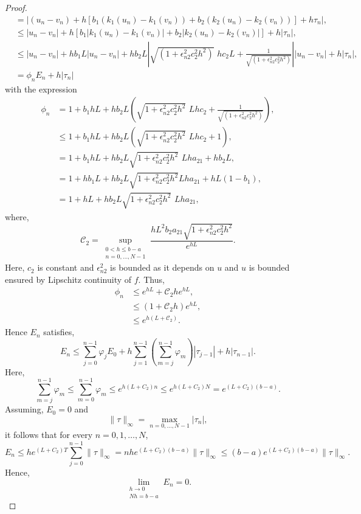 \documentclass[a4paper, preprint,11pt]{elsarticle}
\numberwithin{equation}{section}
\begin{document}
\begin{proof}
\begin{align*}
& = |(u_n - v_n) + h [ b_1(k_1(u_n) - k_1(v_n)) + b_2(k_2(u_n) - k_2(v_n))] + h\tau_n|, \\
& \leq |u_n -v_n| + h [b_1|k_1(u_n) - k_1(v_n)| + b_2|k_2(u_n)- k_2(v_n)|] + h|\tau_n|, \\
& \leq|u_n -v_n| + hb_1 L|u_n -v_n| + h b_2 L\left| \sqrt{(1 + \epsilon_{n2}^2 c_{2}^2 h^2)}\,\,  h c_2 L + \frac{1}{\sqrt{(1 + \epsilon_{n2}^2 c_{2}^2 h^2)}}\right||u_n -v_n|  + h|\tau_n|, \\
& = \phi_n E_n + h|\tau_n|
\end{align*}
with the expression
\begin{align*}
    \phi_n & = 1 + b_1hL + hb_2 L \left( \sqrt{1 + \epsilon_{n2}^2 c_{2}^2 h^2} \,\, L h c_2  + \frac{1}{\sqrt{(1 + \epsilon_{n2}^2 c_{2}^2 h^2)}} \right), \\
   & \leq 1 + b_1 h L + h b_2 L \left(\sqrt{1 + \epsilon_{n2}^2 c_{2}^2h^2}\,\, L h c_2 + 1\right), \\
   & = 1 + b_1 h L + h b_2 L \sqrt{1 + \epsilon_{n2}^2 c_{2}^2h^2}\,\,L ha_{21} + hb_2L, \\
   & = 1 + hb_1L + hb_2L\sqrt{1 + \epsilon_{n2}^2 c_{2}^2h^2}L ha_{21} + hL(1 - b_1), \\
   & = 1 + hL + hb_2L\sqrt{1 + \epsilon_{n2}^2 c_{2}^2h^2} \,\,Lh a_{21} ,
\end{align*}
where,
\[
\mathcal{C}_2 = \sup_{\substack{0 < h \leq b - a \\ n = 0, \dots, N - 1}} 
\frac{h L^2 b_2 a_{21} \sqrt{1 + \epsilon_{n2}^2 c_2^2 h^2}}{e^{hL}}. 
\]
Here, $c_2$ is constant and $\epsilon_{n2}^2$ is bounded as it depends on $u$ and $u$ is bounded ensured by Lipschitz continuity of $f$. Thus,
\begin{align*}
    \phi_n & \leq e^{hL} + \mathcal{C}_2 h e^{hL}, \\
      & \leq (1 + \mathcal{C}_2 h) e^{hL}, \\
      & \leq e^{h(L+\mathcal{C}_2)}.
\end{align*}
Hence $E_n$ satisfies, 
\begin{equation*}
    E_n \leq \sum_{j=0}^{n-1} \varphi_j E_0 + h \sum_{j=1}^{n-1} \left( \sum_{m=j}^{n-1} \varphi_m \right) |\tau_{j-1}| + h |\tau_{n-1}|.
\end{equation*}
Here,
\begin{equation*}
    \sum_{m=j}^{n-1} \varphi_m \leq \sum_{m=0}^{n-1} \varphi_m \leq e^{h(L + C_2) n} \leq e^{h(L + C_2) N} = e^{(L + C_2)(b - a)}.
\end{equation*}
Assuming, \( E_0 = 0 \) and
\[
\|\tau\|_\infty = \max_{n = 0, \dots, N-1} |\tau_n|,
\]
it follows that for every \( n = 0, 1, \dots, N \),
\begin{equation*}
    E_n \leq h e^{(L + C_2) T} \sum_{j=0}^{n-1} \|\tau\|_\infty = n h e^{(L + C_2)(b - a)} \|\tau\|_\infty \leq (b - a) e^{(L + C_2)(b - a)} \|\tau\|_\infty.
\end{equation*}
Hence,
\begin{equation*}
\lim_{\substack{h \to 0 \\ N h = b - a}} E_n = 0.
\end{equation*}
\end{proof}
\end{document}
